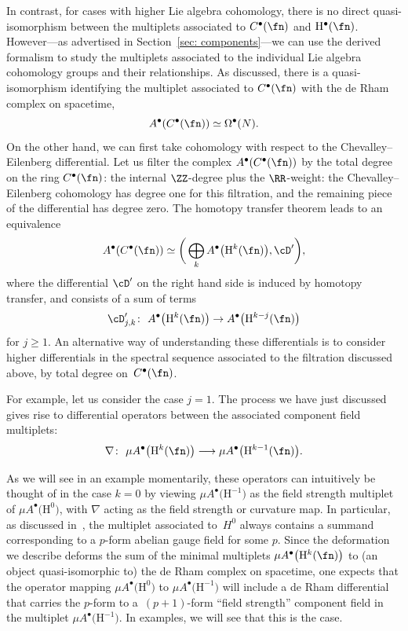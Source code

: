 \documentclass[10pt,a4paper]{amsart}
\numberwithin{equation}{section}
\def\bu{\bullet}
\begin{document}
In contrast, for cases with higher Lie algebra cohomology, there is no direct quasi-isomorphism between the multiplets associated to $C^\bullet(\fn)$ and $\mathrm H^\bullet(\fn)$. However---as advertised in Section~\ref{sec: components}---we can use the derived formalism to study the multiplets associated to the individual Lie algebra cohomology groups and their relationships. As discussed, there is a quasi-isomorphism identifying the multiplet associated to $C^\bullet(\fn)$ with the de Rham complex on spacetime,
\begin{equation*}
A^\bullet(C^\bullet(\fn)) \simeq \Omega^\bullet(N) .
\end{equation*}
On the other hand, we can first take cohomology with respect to the Chevalley--Eilenberg differential. Let us filter the complex $A^\bullet(C^\bullet(\fn))$ by the total degree on the ring $C^\bullet(\fn)$: the internal $\ZZ$-degree plus the $\RR$-weight: the Chevalley--Eilenberg cohomology has degree one for this filtration, and the remaining piece of the differential has degree zero. The homotopy transfer theorem leads to an equivalence
\begin{equation*}
A^\bullet(C^\bullet(\fn)) \simeq \bigg( \bigoplus_k A^\bullet\big(\mathrm H^k(\fn)\big) , \cD' \bigg) ,
\end{equation*}
where the differential $\cD'$ on the right hand side is induced by homotopy transfer, and consists of a sum of terms
\begin{equation*}
\cD'_{j,k} \colon \ A^\bullet\big(\mathrm H^k(\fn)\big) \to A^\bullet\big(\mathrm H^{k-j}(\fn)\big)
\end{equation*}
for $j \ge 1$. An alternative way of understanding these differentials is to consider higher differentials in the spectral sequence associated to the filtration discussed above, by total degree on~$C^\bullet(\fn)$.

For example, let us consider the case $j=1$. The process we have just discussed gives rise to differential operators between the associated component field multiplets:
\begin{equation*}
\nabla \colon \ \mu A^\bullet\big(\mathrm H^k(\fn)\big) \longrightarrow \mu A^\bullet\big(\mathrm H^{k-1}(\fn)\big) .
\end{equation*}

As we will see in an example momentarily, these operators can intuitively be thought of in the case $k=0$ by viewing $\mu A^\bullet\big(\mathrm H^{-1}\big)$ as the field strength multiplet of $\mu A^\bullet\big(\mathrm H^0\big)$, with $\nabla$ acting as the field strength or curvature map.
In particular, as discussed in~\cite{perspectives}, the multiplet associated to~$H^0$ always contains a summand corresponding to a $p$-form abelian gauge field for some $p$. Since the deformation we describe deforms the sum of the minimal multiplets $\mu A^\bu\big(\mathrm H^k(\fn)\big)$ to (an object quasi-isomorphic to) the de Rham complex on spacetime, one expects that the operator mapping $\mu A^\bu\big(\mathrm H^0\big)$ to $\mu A^\bu\big(\mathrm H^{-1}\big)$ will include a de Rham differential that carries the $p$-form to a~$(p+1)$-form ``field strength'' component field in the multiplet $\mu A^\bu\big(\mathrm H^{-1}\big)$. In examples, we will see that this is the case.
\end{document}
